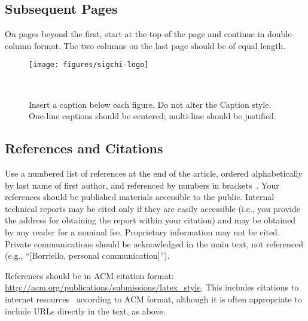 \documentclass{sigchi}
\begin{document}
\subsection{Subsequent Pages}

On pages beyond the first, start at the top of the page and continue
in double-column format.  The two columns on the last page should be
of equal length.

\begin{figure}
\centering
  \texttt{[image: figures/sigchi-logo]}
  \caption{Insert a caption below each figure. Do not alter the
    Caption style.  One-line captions should be centered; multi-line
    should be justified. }~\label{fig:figure1}
\end{figure}

\subsection{References and Citations}

Use a numbered list of references at the end of the article, ordered
alphabetically by last name of first author, and referenced by numbers
in
brackets~\cite{acm_categories,ethics,Klemmer:2002:WSC:503376.503378}.
Your references should be published materials accessible to the
public. Internal technical reports may be cited only if they are
easily accessible (i.e., you provide the address for obtaining the
report within your citation) and may be obtained by any reader for a
nominal fee. Proprietary information may not be cited. Private
communications should be acknowledged in the main text, not referenced
(e.g., ``[Borriello, personal communication]'').

References should be in ACM citation format:
\url{http://acm.org/publications/submissions/latex_style}. This
includes citations to internet
resources~\cite{acm_categories,cavender:writing,CHINOSAUR:venue,psy:gangnam}
according to ACM format, although it is often appropriate to include
URLs directly in the text, as above.


\end{document}
